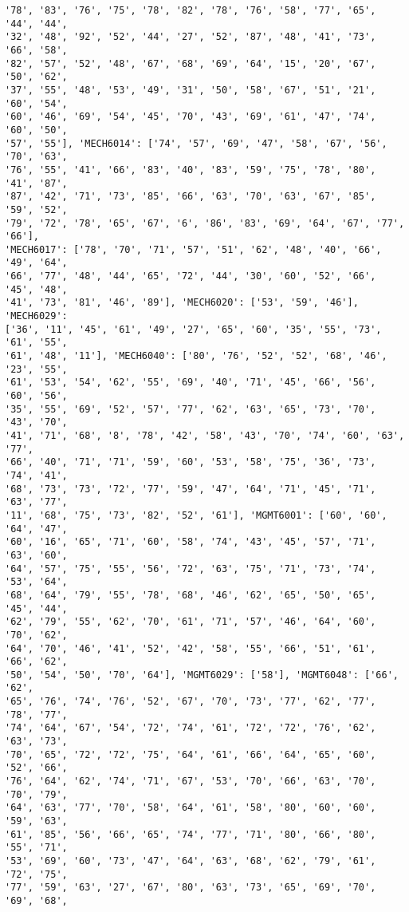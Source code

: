 \documentclass[11pt]{article}
\begin{document}
\begin{Verbatim}[commandchars=\\\{\}]
'78', '83', '76', '75', '78', '82', '78', '76', '58', '77', '65', '44', '44',
'32', '48', '92', '52', '44', '27', '52', '87', '48', '41', '73', '66', '58',
'82', '57', '52', '48', '67', '68', '69', '64', '15', '20', '67', '50', '62',
'37', '55', '48', '53', '49', '31', '50', '58', '67', '51', '21', '60', '54',
'60', '46', '69', '54', '45', '70', '43', '69', '61', '47', '74', '60', '50',
'57', '55'], 'MECH6014': ['74', '57', '69', '47', '58', '67', '56', '70', '63',
'76', '55', '41', '66', '83', '40', '83', '59', '75', '78', '80', '41', '87',
'87', '42', '71', '73', '85', '66', '63', '70', '63', '67', '85', '59', '52',
'79', '72', '78', '65', '67', '6', '86', '83', '69', '64', '67', '77', '66'],
'MECH6017': ['78', '70', '71', '57', '51', '62', '48', '40', '66', '49', '64',
'66', '77', '48', '44', '65', '72', '44', '30', '60', '52', '66', '45', '48',
'41', '73', '81', '46', '89'], 'MECH6020': ['53', '59', '46'], 'MECH6029':
['36', '11', '45', '61', '49', '27', '65', '60', '35', '55', '73', '61', '55',
'61', '48', '11'], 'MECH6040': ['80', '76', '52', '52', '68', '46', '23', '55',
'61', '53', '54', '62', '55', '69', '40', '71', '45', '66', '56', '60', '56',
'35', '55', '69', '52', '57', '77', '62', '63', '65', '73', '70', '43', '70',
'41', '71', '68', '8', '78', '42', '58', '43', '70', '74', '60', '63', '77',
'66', '40', '71', '71', '59', '60', '53', '58', '75', '36', '73', '74', '41',
'68', '73', '73', '72', '77', '59', '47', '64', '71', '45', '71', '63', '77',
'11', '68', '75', '73', '82', '52', '61'], 'MGMT6001': ['60', '60', '64', '47',
'60', '16', '65', '71', '60', '58', '74', '43', '45', '57', '71', '63', '60',
'64', '57', '75', '55', '56', '72', '63', '75', '71', '73', '74', '53', '64',
'68', '64', '79', '55', '78', '68', '46', '62', '65', '50', '65', '45', '44',
'62', '79', '55', '62', '70', '61', '71', '57', '46', '64', '60', '70', '62',
'64', '70', '46', '41', '52', '42', '58', '55', '66', '51', '61', '66', '62',
'50', '54', '50', '70', '64'], 'MGMT6029': ['58'], 'MGMT6048': ['66', '62',
'65', '76', '74', '76', '52', '67', '70', '73', '77', '62', '77', '78', '77',
'74', '64', '67', '54', '72', '74', '61', '72', '72', '76', '62', '63', '73',
'70', '65', '72', '72', '75', '64', '61', '66', '64', '65', '60', '52', '66',
'76', '64', '62', '74', '71', '67', '53', '70', '66', '63', '70', '70', '79',
'64', '63', '77', '70', '58', '64', '61', '58', '80', '60', '60', '59', '63',
'61', '85', '56', '66', '65', '74', '77', '71', '80', '66', '80', '55', '71',
'53', '69', '60', '73', '47', '64', '63', '68', '62', '79', '61', '72', '75',
'77', '59', '63', '27', '67', '80', '63', '73', '65', '69', '70', '69', '68',

\end{Verbatim}
\end{document}
